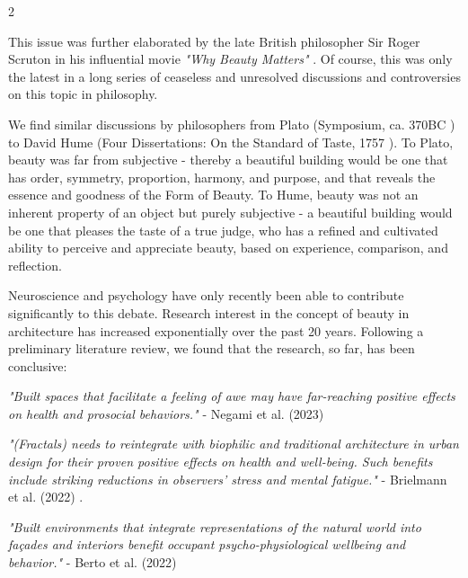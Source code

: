 \documentclass{article}
\begin{document}
\clearpage
\begin{multicols}{2}

This issue was further elaborated by the late British philosopher Sir Roger Scruton in his influential movie \textit{"Why Beauty Matters"} \cite{scruton_why_2009}. Of course, this was only the latest in a long series of ceaseless and unresolved discussions and controversies on this topic in philosophy.

We find similar discussions by philosophers from Plato (Symposium, ca. 370BC \cite{plato_symposium_1795}) to David Hume (Four Dissertations: On the Standard of Taste, 1757 \cite{hume_iv_1757}). To Plato, beauty was far from subjective - thereby a beautiful building would be one that has order, symmetry, proportion, harmony, and purpose, and that reveals the essence and goodness of the Form of Beauty. To Hume, beauty was not an inherent property of an object but purely subjective - a beautiful building would be one that pleases the taste of a true judge, who has a refined and cultivated ability to perceive and appreciate beauty, based on experience, comparison, and reflection.

Neuroscience and psychology have only recently been able to contribute significantly to this debate. Research interest in the concept of beauty in architecture has increased exponentially over the past 20 years. Following a preliminary literature review, we found that the research, so far, has been conclusive:


\textit{"Built spaces that facilitate a feeling of awe may have far-reaching positive effects on health and prosocial behaviors."} - Negami et al. (2023) \cite{negami_how_2023}

\textit{"(Fractals) needs to reintegrate with biophilic and traditional architecture in urban design for their proven positive effects on health and well-being. Such beneﬁts include striking reductions in observers’ stress and mental fatigue."} \newline - Brielmann et al. (2022) \cite{brielmann_what_2022}.

\textit{"Built environments that integrate representations of the natural world into façades and interiors benefit occupant psycho-physiological wellbeing and behavior."} - Berto et al. (2022) \cite{berto_biophilic_2022}


\end{multicols}
\end{document}
